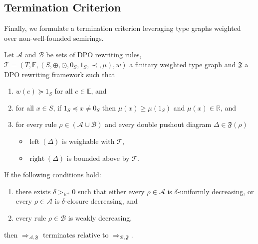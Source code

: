 




\subsection{Termination Criterion}
\label{nwf:sec:proving_termination}
Finally, we formulate a termination criterion leveraging type graphs weighted over non-well-founded semirings. 
\begin{theorem} 
    \label{nwf:thm:termination_grs}
    Let $\mathcal{A}$ and $\mathcal{B}$ be sets of DPO rewriting rules, $\mathcal{T} = (T,\mathbb{E}, (S, \oplus, \odot, 0_S, 1_S, \prec, \mu), w)$ a finitary weighted type graph and $\mathfrak{F}$ a DPO rewriting framework such that

     \begin{enumerate}[label=\roman*)]
        \item\label{thm1:hyp3} $w(e) \succeq 1_S$ for all $e \in \mathbb{E}$, and
        \item\label{thm1:hyp4} for all $x \in S$, if $ 1_S \preceq x \neq 0_S$ then $\mu(x) \geq \mu(1_S)$ and $\mu(x) \in \mathbb{R}$, and
        \item for every rule $\rho \in (\mathcal{A }\cup \mathcal{B })$ and every double pushout diagram  
        $\Delta \in \mathfrak{F}(\rho)$ 
        \begin{itemize}
            \item \(\operatorname{left}(\Delta)\) is weighable with \(\mathcal{T}\),
            \item \(\operatorname{right}(\Delta)\) is bounded above by \(\mathcal{T}\). 
        \end{itemize}
    \end{enumerate}       

    \noindent If the following conditions hold:
    \begin{enumerate}
        \item there exists $\delta >_{\mathbb{R}^+} 0$ such that either every $\rho \in \mathcal{A}$ is $\delta$-uniformly decreasing, or every $\rho \in \mathcal{A}$ is $\delta$-closure decreasing, and
        \item every rule $\rho \in \mathcal{B}$ is weakly decreasing,
    \end{enumerate}
    then $\Rightarrow_{\mathcal{A},\mathfrak{F}}$ terminates relative to $\Rightarrow_{\mathcal{B},\mathfrak{F}}$.
\end{theorem} 
 
